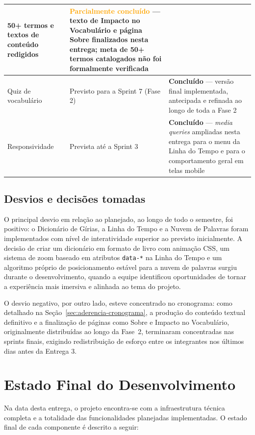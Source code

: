 \documentclass[12pt,a4paper]{article}
\begin{document}
\begin{table}[H]
\begin{tabular}{>{\raggedright}m{3.5cm} >{\raggedright}m{4.5cm} >{\raggedright\arraybackslash}m{4.5cm}}
50+ termos e textos de conteúdo redigidos &
\textcolor{orange}{\textbf{Parcialmente concluído}} — texto de Impacto no Vocabulário e página
Sobre finalizados nesta entrega; meta de 50+ termos catalogados não foi formalmente verificada
\\
\hline
Quiz de vocabulário &
Previsto para a Sprint 7 (Fase 2) &
\textcolor{verdeEscuro}{\textbf{Concluído}} — versão final implementada, antecipada e refinada
ao longo de toda a Fase 2 \\
\hline
Responsividade &
Prevista até a Sprint 3 &
\textcolor{verdeEscuro}{\textbf{Concluído}} — \textit{media queries} ampliadas nesta entrega
para o menu da Linha do Tempo e para o comportamento geral em telas mobile \\
\bottomrule
\end{tabular}
\end{table}

\subsection{Desvios e decisões tomadas}

O principal desvio em relação ao planejado, ao longo de todo o semestre, foi positivo: o
Dicionário de Gírias, a Linha do Tempo e a Nuvem de Palavras foram implementados com nível de
interatividade superior ao previsto inicialmente. A decisão de criar um dicionário em formato de
livro com animação CSS, um sistema de zoom baseado em atributos \texttt{data-*} na Linha do
Tempo e um algoritmo próprio de posicionamento estável para a nuvem de palavras surgiu durante o
desenvolvimento, quando a equipe identificou oportunidades de tornar a experiência mais imersiva
e alinhada ao tema do projeto.

O desvio negativo, por outro lado, esteve concentrado no cronograma: como detalhado na
Seção~\ref{sec:aderencia-cronograma}, a produção do conteúdo textual definitivo e a finalização
de páginas como Sobre e Impacto no Vocabulário, originalmente distribuídas ao longo da Fase~2,
terminaram concentradas nas sprints finais, exigindo redistribuição de esforço entre os
integrantes nos últimos dias antes da Entrega 3.

\section{Estado Final do Desenvolvimento}

Na data desta entrega, o projeto encontra-se com a infraestrutura técnica completa e a totalidade
das funcionalidades planejadas implementadas. O estado final de cada componente é descrito a
seguir:
\end{document}
